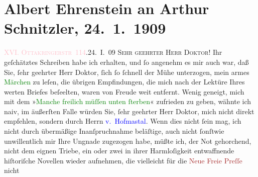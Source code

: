 

               \section[Albert Ehrenstein an Arthur Schnitzler, 24. 1. 1909]{ Albert Ehrenstein an Arthur Schnitzler, 24. 1. 1909}\nopagebreak{}\rehead{ }\normalsize\beginnumbering{} \toendnotes[C]{\smallbreak\pagebreak[2]} 
\toendnotes[C]{\smallbreak}\pstart
           {\pb}\textcolor{pink}{XVI. \textsc{Ottakringerstr} 114}{}\ledrightnote{\textcolor{pink}{Ottakringerstraße}}.\hfill 24. I. 09\pend
           \pstart{}\textsc{Sehr geehrter Herr Doktor!}\pend\pstart
           Ihr geſchätztes Schreiben habe ich erhalten, und ſo angenehm es mir auch war, daß
                    Sie, ſehr geehrter Herr Doktor, ſich ſo ſchnell der Mühe unterzogen, mein armes
                        \textcolor{green}{Märchen}{} zu leſen, die
                    übrigen Empfindungen, die mich nach der Lektüre Ihres werten Briefes beſeelten,
                    waren von Freude weit entfernt. Wenig geneigt, mich mit dem »\textcolor{green}{Manche freilich müſſen unten ſterben}{}«
                    zufrieden zu geben, wähnte ich naiv, im äußerſten Falle würden Sie, ſehr
                    geehrter Herr Doktor, mich nicht direkt empfehlen, sondern durch Herrn \textcolor{blue}{v. Hofma{\geminationn}stal}{}\ledrightnote{\textcolor{blue}{Hugo von Hofmannsthal}}.
                    Wenn dies nicht ſein mag, ich nicht durch übermäßige Inanſpruchnahme beläſtige,
                    auch nicht {\pb}ſonſtwie unwillentlich mir Ihre Ungnade
                    zugezogen habe, müßte ich, der Not gehorchend, nicht dem eignen Triebe, ein oder
                    zwei in ihrer Harmloſigkeit entwaffnende hiſtoriſche Novellen wieder aufnehmen,
                    die vielleicht für die \textcolor{brown}{Neue Freie Preſſe}{}\ledrightnote{\textcolor{brown}{Neue Freie Presse}} nicht
